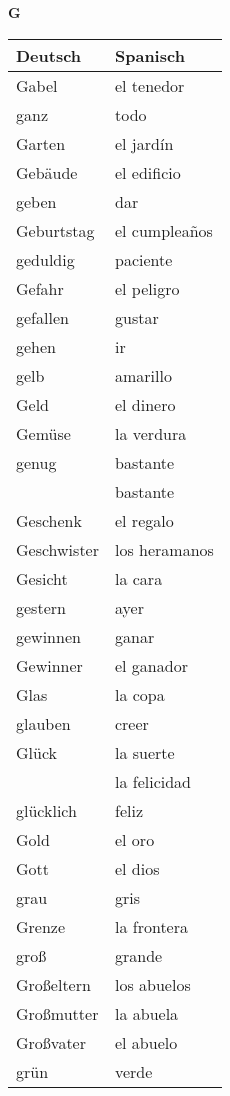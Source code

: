 \begin{flushright}\begin{Huge}\textbf{G}\end{Huge}\end{flushright}

\begin{longtable}{p{} p{}} 
\textbf{Deutsch}     & \textbf{Spanisch}                                       \\ \hline
\hline
\endhead %
Gabel & el tenedor\\
ganz & todo\\
Garten & el jardín\\
Gebäude & el edificio\\
geben & dar\\
Geburtstag & el cumpleaños\\
geduldig & paciente\\
Gefahr & el peligro\\
gefallen & gustar\\
gehen & ir\\
gelb & amarillo \\
Geld & el dinero\\
Gemüse & la verdura\\
genug & bastante\\
~ & bastante\\
Geschenk & el regalo\\
Geschwister & los heramanos \\
Gesicht & la cara\\
gestern & ayer\\
gewinnen & ganar\\
Gewinner & el ganador\\
Glas & la copa\\
glauben & creer\\
Glück & la suerte \\
~ & la felicidad \\
glücklich & feliz\\
Gold & el oro\\
Gott & el dios\\
grau & gris \\
Grenze & la frontera\\
groß & grande\\
Großeltern & los abuelos\\
Großmutter & la abuela\\
Großvater & el abuelo\\
grün & verde\\

\end{longtable}
